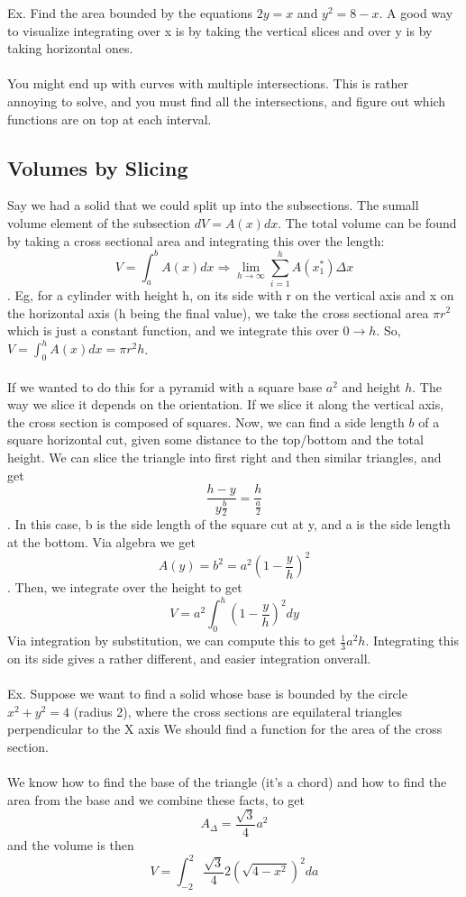 \documentclass[twocolumn, 12pt]{report}
\begin{document}
Ex. Find the area bounded by the equations $2y = x$ and $y^2 = 8-x $. A good way to visualize integrating over x is by taking the vertical slices and over y is by taking horizontal ones. \\\\

You might end up with curves with multiple intersections. This is rather annoying to solve, and you must find all the intersections, and figure out which functions are on top at each interval.

\subsection{Volumes by Slicing}
Say we had a solid that we could split up into the subsections. The sumall volume element of the subsection $dV = A(x)dx$. The total volume can be found by taking a cross sectional area and integrating this over the length:
$$V = \int_a^b A(x)dx \Rightarrow \lim_{h\to \infty}\sum_{i=1}^h A(x_1^*)\Delta x$$. Eg, for a cylinder with height h, on its side with r on the vertical axis and x on the horizontal axis (h being the final value), we take the cross sectional area $\pi r^2$ which is just a constant function, and we integrate this over $0\to h$. So, $V = \int_0^h A(x)dx = \pi r^2 h$.\\\\ If we wanted to do this for a pyramid with a square base $a^2$ and height $h$. The way we slice it depends on the orientation. If we slice it along the vertical axis, the cross section is composed of squares. Now, we can find a side length $b$ of a square horizontal cut, given some distance to the top/bottom and the total height. We can slice the triangle into first right and then similar triangles, and get $$\frac{h-y}{y\frac{b}{2}} = \frac{h}{\frac{a}{2}}$$.
In this case, b is the side length of the square cut at y, and a is the side length at the bottom. Via algebra we get $$A(y) = b^2  = a^2 (1-\frac{y}{h})^2$$. Then, we integrate over the height to get $$V = a^2 \int_0^h (1-\frac{y}{h})^2 dy$$ Via integration by substitution, we can compute this to get $\frac{1}{3} a^2 h$. Integrating this on its side gives a rather different, and easier integration onverall.\\\\Ex. Suppose we want to find a solid whose base is bounded by the circle $x^2 + y^2 = 4$ (radius 2), where the cross sections are equilateral triangles perpendicular to the X axis We should find a function for the area of the cross section.\\\\ We know how to find the base of the triangle (it's a chord) and how to find the area from the base and we combine these facts, to get $$A_\Delta = \frac{\sqrt{3}}{4}a^2$$ and the volume is then $$V = \int_{-2}^{2} \frac{\sqrt{3}}{4}2(\sqrt{4-x^2})^2 da$$
\end{document}
